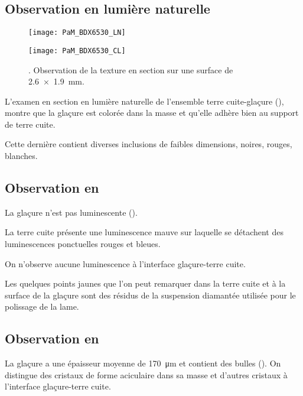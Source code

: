 \subsection{Observation en lumière naturelle}
\begin{figure}[htb]
  \begin{minipage}[t]{0.48\textwidth}
    \centerfloat
    \texttt{[image: PaM\_BDX6530\_LN]}%
  \end{minipage}%
  \hfill%
  \begin{minipage}[t]{0.48\textwidth}
    \centerfloat
    \texttt{[image: PaM\_BDX6530\_CL]}%
    \subcaption{\CL \label{texture:6530_CL}}
  \end{minipage}
  \caption[\ -- Observation de la texture en section]
          {\legendeC. 
           Observation de la texture en section sur une surface de 
           \SI{2.6x1.9}{\mm}.}
  \label{texture:6530}
\end{figure}

L'examen en section en lumière naturelle de l'ensemble terre 
cuite-glaçure (), montre que la glaçure est 
colorée dans la masse et qu'elle adhère bien au support de terre cuite.

Cette dernière contient diverses inclusions de faibles dimensions,
noires, rouges, blanches.

\subsection{Observation en \CL}
La glaçure n'est pas luminescente ().

La terre cuite présente une luminescence mauve sur laquelle se 
détachent des luminescences ponctuelles rouges et bleues.

On n'observe aucune luminescence à l'interface glaçure-terre cuite.

Les quelques points jaunes que l'on peut remarquer dans la terre cuite 
et à la surface de la glaçure sont des résidus de la suspension 
diamantée utilisée pour le polissage de la lame.

\subsection{Observation en \MEB[ie]}
La glaçure a une épaisseur moyenne de \SI{170}{\um} et contient 
des bulles (). On distingue des cristaux de 
forme aciculaire dans sa masse et d'autres cristaux à l'interface 
glaçure-terre cuite.

